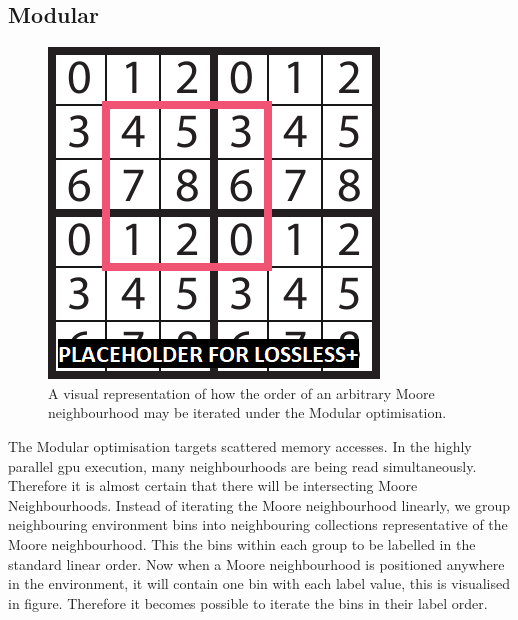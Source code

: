     

  \subsection{Modular}
\begin{figure}
\centering
\includegraphics[width=\linewidth]{../resources/modular/placeholder.png}
\caption{A visual representation of how the order of an arbitrary Moore neighbourhood may be iterated under the Modular optimisation.}
\end{figure}
    The Modular optimisation targets scattered memory accesses. In the highly parallel \gls{gpu} execution, many neighbourhoods are being read simultaneously. Therefore it is almost certain that there will be intersecting Moore Neighbourhoods. Instead of iterating the Moore neighbourhood linearly, we group neighbouring environment bins into neighbouring collections representative of the Moore neighbourhood. This the bins within each group to be labelled in the standard linear order. Now when a Moore neighbourhood is positioned anywhere in the environment, it will contain one bin with each label value, this is visualised in figure. Therefore it becomes possible to iterate the bins in their label order.
    
